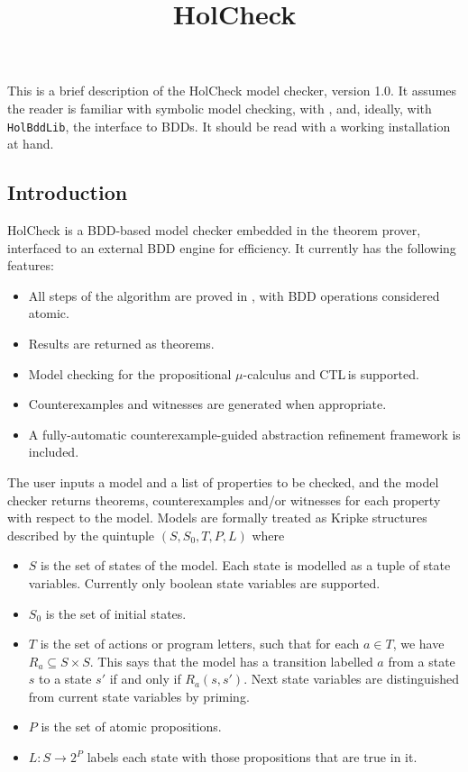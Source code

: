 \documentclass[12pt,fleqn]{article}
\title{HolCheck}
\date{}
\newcommand{\ctl}{\textsf{CTL}\,}
\newcommand{\hc}{HolCheck}
\begin{document}
\maketitle
{}
This is a brief description of the \hc{}\index{holCheckLib!\hc{}} model checker, version 1.0. It assumes the reader is familiar with symbolic model checking, with \HOL{}, and, ideally, with \texttt{HolBddLib}, the \HOL{} interface to BDDs. It should be read with a working \HOL{} installation at hand.

\subsection{Introduction}\label{sec:intro}

\hc{} is a BDD-based model checker embedded in the \HOL{} theorem prover, interfaced to an external BDD engine for efficiency. It currently has the following features:

\begin{itemize}
\item All steps of the algorithm are proved in \HOL{}, with BDD operations considered atomic.
\item Results are returned as \HOL{} theorems.
\item Model checking for the propositional \(\mu\)-calculus and \ctl is supported.
\item Counterexamples and witnesses are generated when appropriate.
\item A fully-automatic counterexample-guided abstraction refinement framework is included.
\end{itemize}

The user inputs a model and a list of properties to be checked, and the model checker returns theorems, counterexamples and/or witnesses for each property with respect to the model. Models are formally treated as Kripke structures described by the quintuple \( (S, S_0, T, P, L) \) where

\begin{itemize}
\item \( S \) is the set of states of the model. Each state is modelled as a tuple of state variables. Currently only boolean state variables are supported.
\item \( S_0\) is the set of initial states.
\item \( T \) is the set of actions or program letters, such that for each \( a \in T \), we have \( R_a \subseteq S \times S\). This says that the model has a transition labelled \( a \) from a state \( s \) to a state \( s' \) if and only if \( R_a(s,s') \). Next state variables are distinguished from current state variables by priming.
\item \( P \) is the set of atomic propositions.
\item \( L:S\rightarrow 2^P \) labels each state with those propositions that are true in it.
\end{itemize}
\end{document}
